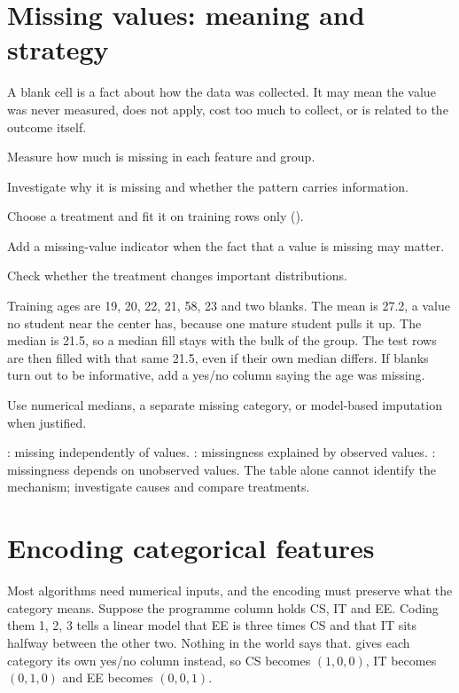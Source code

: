\section{Missing values: meaning and strategy}

A blank cell is a fact about how the data was collected. It may mean the value was never measured, does not apply, cost too much to collect, or is related to the outcome itself.

\begin{utpsteps}
  \item Measure how much is missing in each feature and group.
  \item Investigate why it is missing and whether the pattern carries information.
  \item Choose a treatment and fit it on training rows only ().
  \item Add a missing-value indicator when the fact that a value is missing may matter.
  \item Check whether the treatment changes important distributions.
\end{utpsteps}

\begin{workedexample}
Training ages are 19, 20, 22, 21, 58, 23 and two blanks. The mean is 27.2, a value no student near the center has, because one mature student pulls it up. The median is 21.5, so a median fill stays with the bulk of the group. The test rows are then filled with that same 21.5, even if their own median differs. If blanks turn out to be informative, add a yes/no column saying the age was missing.
\end{workedexample}

Use numerical medians, a separate missing category, or model-based imputation when justified.

: missing independently of values. : missingness explained by observed values. : missingness depends on unobserved values. The table alone cannot identify the mechanism; investigate causes and compare treatments.

\section{Encoding categorical features}

Most algorithms need numerical inputs, and the encoding must preserve what the category means. Suppose the programme column holds CS, IT and EE. Coding them 1, 2, 3 tells a linear model that EE is three times CS and that IT sits halfway between the other two. Nothing in the world says that.  gives each category its own yes/no column instead, so CS becomes $(1,0,0)$, IT becomes $(0,1,0)$ and EE becomes $(0,0,1)$.

